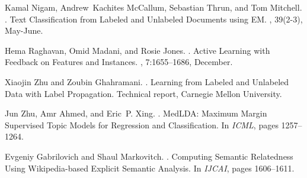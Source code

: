 \documentclass[11pt]{article}
\begin{document}
\begin{thebibliography}{10}
Kamal Nigam, Andrew~Kachites McCallum, Sebastian Thrun, and Tom Mitchell.
.
\newblock Text Classification from Labeled and Unlabeled Documents using EM.
,
  39(2-3), May-June.

Hema Raghavan, Omid Madani, and Rosie Jones.
.
\newblock Active Learning with Feedback on Features and Instances.
, 7:1655--1686, December.

Xiaojin Zhu and Zoubin Ghahramani.
.
\newblock Learning from Labeled and Unlabeled Data with Label Propagation.
\newblock Technical report, Carnegie Mellon University.

Jun Zhu, Amr Ahmed, and Eric~P. Xing.
.
\newblock MedLDA: Maximum Margin Supervised Topic Models for Regression and
  Classification.
\newblock In {\em ICML}, pages 1257--1264.

Evgeniy Gabrilovich and Shaul Markovitch.
.
\newblock Computing Semantic Relatedness Using Wikipedia-based Explicit Semantic Analysis.
\newblock In {\em IJCAI}, pages 1606--1611.

\end{thebibliography}
\end{document}

